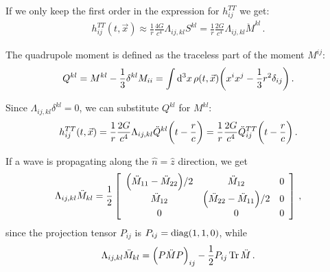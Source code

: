 \documentclass[main.tex]{subfiles}
\begin{document}
If we only keep the first order in the expression for \(h^{TT}_{ij} \) we get: 
%
\begin{align}
h_{ij}^{TT} (t, \vec{x}) \approx \frac{1}{r} \frac{4G}{c^{4}} \Lambda_{ij, kl} S^{kl}
= \frac{1}{r} \frac{2G}{c^{4}} \Lambda_{ij,kl} \ddot{M}^{kl}
\,.
\end{align}

The quadrupole moment is defined as the traceless part of the moment \(M^{ij}\):
%
\begin{align}
Q^{kl} = M^{kl} - \frac{1}{3} \delta^{kl} M_{ii} 
= \int \dd[3]{x} \rho (t, \vec{x}) \qty(x^{i} x^{j} - \frac{1}{3} r^2 \delta_{ij})
\,.
\end{align}

Since \(\Lambda_{ij, kl} \delta^{kl} =0 \), we can substitute \(Q^{kl}\) for \(M^{kl}\):
%
\begin{align} \label{eq:traceless-transverse-amplitude-from-quadrupole}
h_{ij}^{TT} (t, \vec{x}) = \frac{1}{r} \frac{2G}{c^{4}}
\Lambda_{ij, kl} \ddot{Q}^{kl} \qty(t - \frac{r}{c})
= \frac{1}{r} \frac{2G}{c^{4}} \ddot{Q}^{TT}_{ij} \qty(t - \frac{r}{c})
\,.
\end{align}

If a wave is propagating along the \(\hat{n} = \hat{z}\) direction, we get 
%
\begin{subequations}
\begin{align}
\Lambda_{ij, kl} \ddot{M}_{kl} = \frac{1}{2} \left[\begin{array}{ccc}
\qty(\ddot{M}_{11} - \ddot{M}_{22}) / 2 &  \ddot{M}_{12} & 0 \\ 
\ddot{M}_{12} & \qty(\ddot{M}_{22} - \ddot{M}_{11}) / 2 & 0 \\ 
0 & 0 & 0
\end{array}\right]
\,,
\end{align}
\end{subequations}
%
since the projection tensor \(P_{ij}\) is \(P_{ij} = \text{diag}\qty(1, 1, 0)\), while 
%
\begin{align}
\Lambda_{ij, kl} \ddot{M}_{kl} = \qty(P \ddot{M}P)_{ij} - \frac{1}{2} P_{ij} \Tr \ddot{M}
\,.
\end{align}
\end{document}
